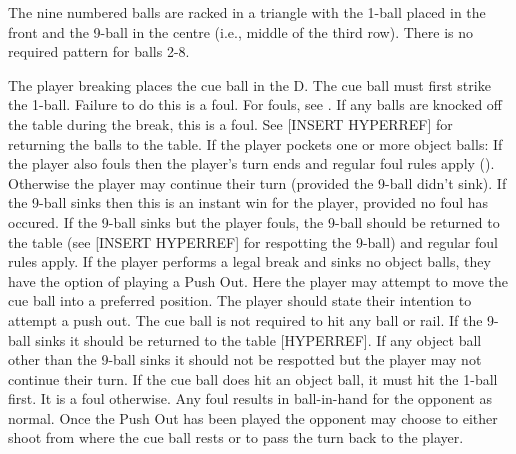 



 {}%
 \DetermineWhoRacks%
%
\subruleitem The nine numbered balls are racked in a triangle with the 1-ball placed in the front and the 9-ball in the centre (i.e., middle of the third row). There is no required pattern for balls 2-8.%
\subruleitem \TightlyPacked%
\subruleitem {}%
\subruleitem {}%
\subruleitem {}%


 The player breaking places the cue ball in the D.%
 The cue ball must first strike the 1-ball. Failure to do this is a foul. For fouls, see .%
 {}%
 \CueBallRailOffBreak%
 \CueBallSinkOffBreak%
 If any balls are knocked off the table during the break, this is a foul. See [INSERT HYPERREF] for returning the balls to the table.%
 If the player pockets one or more object balls:%
\subruleitem If the player also fouls then the player's turn ends and regular foul rules apply ().%
\subruleitem Otherwise the player may continue their turn (provided the 9-ball didn't sink).%
\subruleitem If the 9-ball sinks then this is an instant win for the player, provided no foul has occured.%
\subruleitem If the 9-ball sinks but the player fouls, the 9-ball should be returned to the table (see [INSERT HYPERREF] for respotting the 9-ball) and regular foul rules apply.%
If the player performs a legal break and sinks no object balls, they have the option of playing a Push Out.%
\subruleitem Here the player may attempt to move the cue ball into a preferred position.%
\subruleitem The player should state their intention to attempt a push out.%
\subruleitem The cue ball is not required to hit any ball or rail.%
\subruleitem If the 9-ball sinks it should be returned to the table [HYPERREF].%
\subruleitem If any object ball other than the 9-ball sinks it should not be respotted but the player may not continue their turn.%
\subruleitem If the cue ball does hit an object ball, it must hit the 1-ball first. It is a foul otherwise.%
\subruleitem Any foul results in ball-in-hand for the opponent as normal.%
\subruleitem Once the Push Out has been played the opponent may choose to either shoot from where the cue ball rests or to pass the turn back to the player.%

